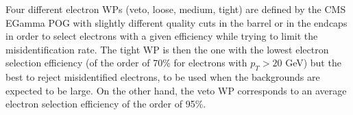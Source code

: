 \documentclass[a4paper, 10pt, openright]{report}
\begin{document}

Four different electron \acp{WP} (veto, loose, medium, tight) are defined by the \ac{CMS} EGamma \ac{POG} \cite{ElePOG} with slightly different quality cuts in the barrel or in the endcaps in order to select electrons with a given efficiency while trying to limit the misidentification rate. The tight \ac{WP} is then the one with the lowest electron selection efficiency (of the order of 70\% for electrons with $p_T > 20$ GeV) but the best to reject misidentified electrons, to be used when the backgrounds are expected to be large. On the other hand, the veto \ac{WP} corresponds to an average electron selection efficiency of the order of 95\%. 
\end{document}
